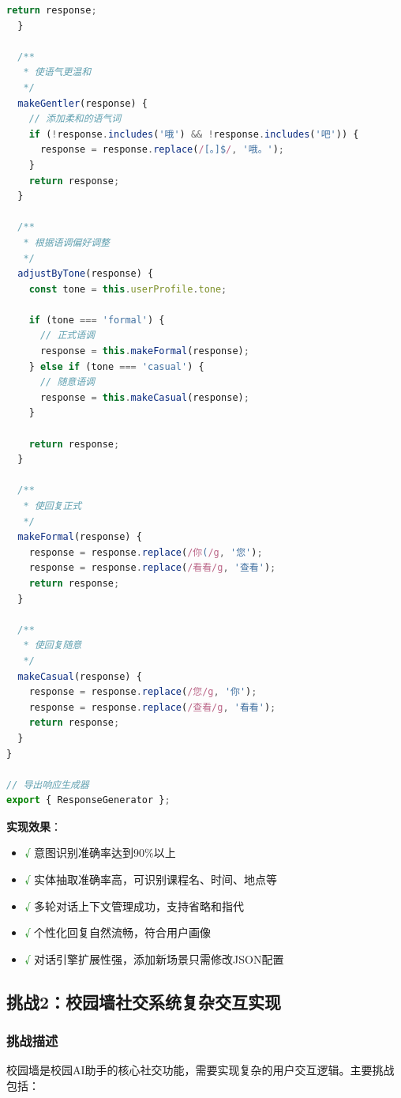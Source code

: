 ﻿\documentclass[12pt,a4paper]{article}
\begin{document}
\begin{lstlisting}[language=JavaScript, caption={响应生成器}]
    return response;
  }
  
  /**
   * 使语气更温和
   */
  makeGentler(response) {
    // 添加柔和的语气词
    if (!response.includes('哦') && !response.includes('吧')) {
      response = response.replace(/[。]$/, '哦。');
    }
    return response;
  }
  
  /**
   * 根据语调偏好调整
   */
  adjustByTone(response) {
    const tone = this.userProfile.tone;
    
    if (tone === 'formal') {
      // 正式语调
      response = this.makeFormal(response);
    } else if (tone === 'casual') {
      // 随意语调
      response = this.makeCasual(response);
    }
    
    return response;
  }
  
  /**
   * 使回复正式
   */
  makeFormal(response) {
    response = response.replace(/你(/g, '您');
    response = response.replace(/看看/g, '查看');
    return response;
  }
  
  /**
   * 使回复随意
   */
  makeCasual(response) {
    response = response.replace(/您/g, '你');
    response = response.replace(/查看/g, '看看');
    return response;
  }
}

// 导出响应生成器
export { ResponseGenerator };
\end{lstlisting}

\textbf{实现效果}：
\begin{itemize}
    \item \textcolor{green}{√} 意图识别准确率达到90\%以上
    \item \textcolor{green}{√} 实体抽取准确率高，可识别课程名、时间、地点等
    \item \textcolor{green}{√} 多轮对话上下文管理成功，支持省略和指代
    \item \textcolor{green}{√} 个性化回复自然流畅，符合用户画像
    \item \textcolor{green}{√} 对话引擎扩展性强，添加新场景只需修改JSON配置
\end{itemize}

\subsection{挑战2：校园墙社交系统复杂交互实现}

\subsubsection{挑战描述}

校园墙是校园AI助手的核心社交功能，需要实现复杂的用户交互逻辑。主要挑战包括：
\end{document}

